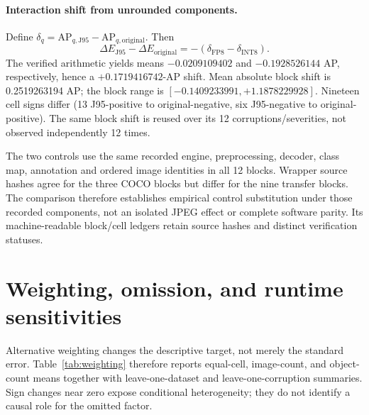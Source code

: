\documentclass[10pt]{article}
\newcommand{\AP}{\mathrm{AP}}
\newcommand{\Jclean}{\mathrm{J95}}
\begin{document}
\FloatBarrier


\paragraph{Interaction shift from unrounded components.}
Define $\delta_q=\AP_{q,\Jclean}-\AP_{q,\mathrm{original}}$. Then
\begin{equation}
\Delta E_{\Jclean}-\Delta E_{\mathrm{original}}=-(\delta_{\mathrm{FP8}}-\delta_{\mathrm{INT8}}).
\end{equation}
The verified arithmetic yields means $-0.0209109402$ and $-0.1928526144$ AP, respectively, hence a $+0.1719416742$-AP shift. Mean absolute block shift is 0.2519263194 AP; the block range is $[-0.1409233991,+1.1878229928]$. Nineteen cell signs differ (13 J95-positive to original-negative, six J95-negative to original-positive). The same block shift is reused over its 12 corruptions/severities, not observed independently 12 times.

The two controls use the same recorded engine, preprocessing, decoder, class map, annotation and ordered image identities in all 12 blocks. Wrapper source hashes agree for the three COCO blocks but differ for the nine transfer blocks. The comparison therefore establishes empirical control substitution under those recorded components, not an isolated JPEG effect or complete software parity. Its machine-readable block/cell ledgers retain source hashes and distinct verification statuses.

\begin{table}[htbp]
\centering\scriptsize
\caption{Clean-control substitution from unrounded ledgers. $\delta$ and block-mean interactions are AP points. The last column records the inference-wrapper qualification; all recorded numerical component identities match.}
\label{tab:codec-interaction}
\resizebox{\textwidth}{!}{}
\end{table}

\FloatBarrier

\section{Weighting, omission, and runtime sensitivities}

Alternative weighting changes the descriptive target, not merely the standard
error. Table~\ref{tab:weighting} therefore reports equal-cell, image-count, and
object-count means together with leave-one-dataset and leave-one-corruption
summaries. Sign changes near zero expose conditional heterogeneity; they do not
identify a causal role for the omitted factor.
\end{document}
